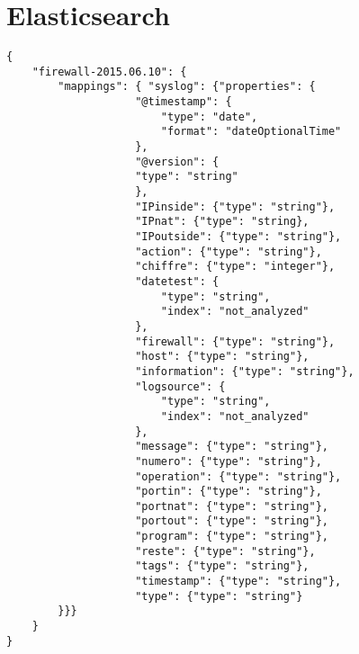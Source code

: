 \section{Elasticsearch}
\begin{lstlisting}[style=code,label={lst:mappingresult},caption={Exemple de mapping}]
{
    "firewall-2015.06.10": {
        "mappings": { "syslog": {"properties": {
                    "@timestamp": {
                        "type": "date",
                        "format": "dateOptionalTime"
                    },
                    "@version": {
                    "type": "string"
                    },
                    "IPinside": {"type": "string"},
                    "IPnat": {"type": "string},
                    "IPoutside": {"type": "string"},
                    "action": {"type": "string"},
                    "chiffre": {"type": "integer"},
                    "datetest": {
                        "type": "string",
                        "index": "not_analyzed"
                    },
                    "firewall": {"type": "string"},
                    "host": {"type": "string"},
                    "information": {"type": "string"},
                    "logsource": {
                        "type": "string",
                        "index": "not_analyzed"
                    },
                    "message": {"type": "string"},
                    "numero": {"type": "string"},
                    "operation": {"type": "string"},
                    "portin": {"type": "string"},
                    "portnat": {"type": "string"},
                    "portout": {"type": "string"},
                    "program": {"type": "string"},
                    "reste": {"type": "string"},
                    "tags": {"type": "string"},
                    "timestamp": {"type": "string"},
                    "type": {"type": "string"}
        }}}
    }
}
\end{lstlisting}
\label{lst:mappingresult}

